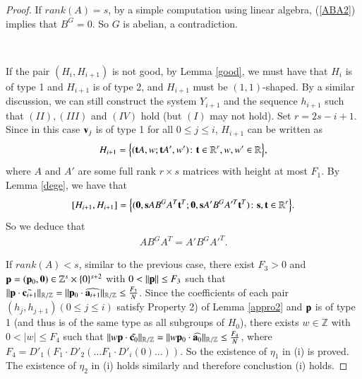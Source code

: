 \documentclass[12pt,amstex]{amsart}
\theoremstyle{definition}
\def \c {\bold{c}}
\def \a {\bold{a}}
\def \v {\bold{v}}
\def \p {\bold{p}}
\begin{document}
\begin{proof}
If $rank(A)= s$, by a simple computation using linear algebra, (\ref{ABA2}) implies that $B^{G}=0$. So $G$ is abelian, a contradiction.

\

If the pair $(H_{i},H_{i+1})$ is not good, by Lemma \ref{good}, we must have that $H_{i}$ is of type 1 and $H_{i+1}$ is of type 2,
and $H_{i+1}$ must be $(1,1)$-shaped. By a similar discussion,
we can still construct the system $Y_{i+1}$ and the sequence $h_{i+1}$ such that $(II),(III)$ and $(IV)$ hold (but $(I)$ may not hold).
Set $r=2s-i+1$. Since in this case $\v_{j}$ is of type 1 for all $0\leq j\leq i$, $H_{i+1}$ can be written as
\begin{equation}\nonumber
 \begin{split}
  H_{i+1}=\Bigl\{ (\bold{t}A,w;\bold{t}A',w')\colon\bold{t}\in\mathbb{R}^{r}, w,w'\in\mathbb{R}\Bigr\},
 \end{split}
\end{equation}
where $A$ and $A'$ are some full rank $r\times s$ matrices with height at most $F_{1}$. By Lemma \ref{dege}, we have that
\begin{equation}\nonumber
 \begin{split}
  [H_{i+1},H_{i+1}]=\Bigl\{ (\bold{0},\bold{s}AB^{G}A^{T}\bold{t}^{T};\bold{0},\bold{s}A'B^{G}A'^{T}\bold{t}^{T})\colon\bold{s},\bold{t}\in\mathbb{R}^{r}\Bigr\}.
 \end{split}
\end{equation}
So we deduce that
\begin{equation}\label{ABA}
 \begin{split}
  AB^{G}A^{T}=A'B^{G}A'^{T}.
 \end{split}
\end{equation}

If $rank(A)<s$, similar to the previous case, there exist $F_{3}>0$ and $\p=(\p_{0},\bold{0})\in\mathbb{Z}^{s}\times\{0\}^{s+2}$ with $0<\Vert\p\Vert\leq F_{3}$ such that
$\Vert\p\cdot\tilde{\c_{i+1}}\Vert_{\mathbb{R}/\mathbb{Z}}=\Vert\p_{0}\cdot\widehat{\a_{i+1}}\Vert_{\mathbb{R}/\mathbb{Z}}\leq\frac{F_{3}}{N}$.
Since the coefficients of each pair $(h_{j},h_{j+1}) (0\leq j\leq i)$ satisfy Property 2) of Lemma \ref{appro2} and $\p$ is of type 1 (and thus is of the same type
as all subgroups of $H_{0}$), there exists
$w\in\mathbb{Z}$ with $0<\vert w\vert\leq F_{4}$ such that
$\Vert w\p\cdot\tilde{\c_{0}}\Vert_{\mathbb{R}/\mathbb{Z}}=\Vert w\p_{0}\cdot\widehat{\a_{0}}\Vert_{\mathbb{R}/\mathbb{Z}}\leq\frac{F_{4}}{N}$,
where $F_{4}=D'_{1}(F_{1}\cdot D'_{2}(\dots F_{1}\cdot D'_{i}(0)\dots))$. So the existence of $\eta_{1}$ in (i) is proved.
The existence of $\eta_{2}$ in (i) holds similarly and therefore conclustion (i) holds.


\end{proof}
\end{document}
